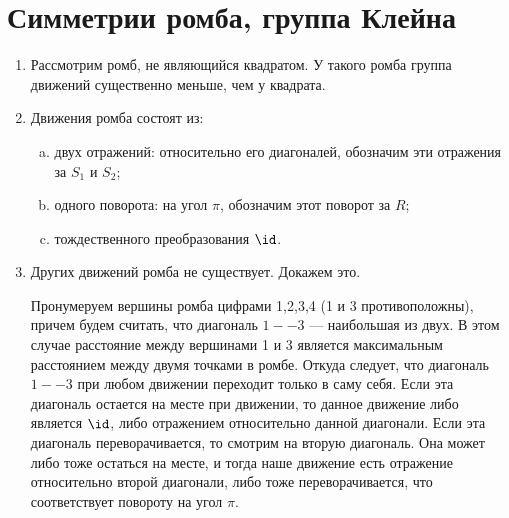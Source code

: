 \section{Симметрии ромба, группа Клейна}


\begin{enumerate}
\item Рассмотрим ромб, не являющийся квадратом. У такого ромба группа движений существенно меньше, чем у квадрата.
\item Движения ромба состоят из:
\begin{enumerate}[a)]
\item двух отражений: относительно его диагоналей, обозначим эти отражения за $S_1$ и $S_2$;
\item одного поворота: на угол $\pi$, обозначим этот поворот за $R$;
\item тождественного преобразования $\id$.
\end{enumerate}
\item Других движений ромба не существует. Докажем это.

Пронумеруем вершины ромба цифрами 1,2,3,4 (1 и 3 противоположны), причем будем считать, что диагональ $1--3$ --- наибольшая из двух. В этом случае расстояние между вершинами 1 и 3 является максимальным расстоянием между двумя точками в ромбе. Откуда следует, что диагональ $1--3$ при любом движении переходит только в саму себя. Если эта диагональ остается на месте при движении, то данное движение либо является $\id$, либо отражением относительно данной диагонали. Если эта диагональ переворачивается, то смотрим на вторую диагональ. Она может либо тоже остаться на месте, и тогда наше движение есть отражение относительно второй диагонали, либо тоже переворачивается, что соответствует повороту на угол $\pi$.


\end{enumerate}
